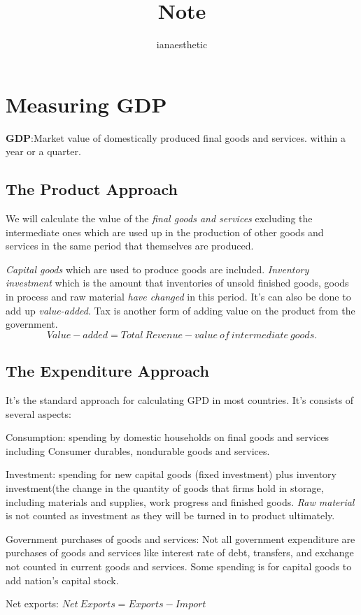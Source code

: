 \documentclass[10pt, a4paper]{article}
\title{Note}
\author{ianaesthetic}
\begin{document}
    \section{Measuring GDP}
        \textbf{GDP}:Market value of domestically produced final goods and services. within a year or a quarter.
        \subsection{The Product Approach}
            We will calculate the value of the \emph{final goods and services} excluding the intermediate ones which are used up in the production of other goods and services in the same period that themselves are produced. 
            
            \emph{Capital goods} which are used to produce goods are included. \emph{Inventory investment} which is the amount that inventories of unsold finished goods, goods in process and raw material \emph{have changed} in this period. It's can also be done to add up \emph{value-added}. Tax is another form of adding value on the product from the government. 
            $$
                Value-added = Total\ Revenue - value\ of\ intermediate\ goods.
            $$

        \subsection{The Expenditure Approach}
            It's the standard approach for calculating GPD in most countries. It's consists of several aspects: 

                Consumption: spending by domestic households on final goods and services including Consumer durables, nondurable goods and services. 
                
                Investment: spending for new capital goods (fixed investment) plus inventory investment(the change in the quantity of goods that firms hold in storage, including materials and supplies, work progress and finished goods. \emph{Raw material} is not counted as investment as they will be turned in to product ultimately.
                
                Government purchases of goods and services: Not all government expenditure are purchases of goods and services like interest rate of debt, transfers, and exchange not counted in current goods and services. Some spending is for capital goods to add nation's capital stock.

                Net exports: $Net\ Exports = Exports - Import$
\end{document}
